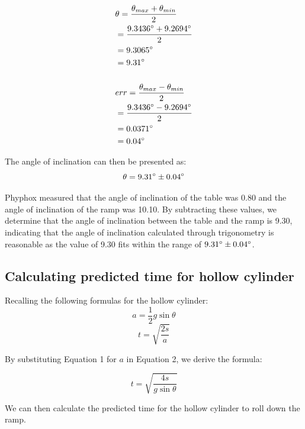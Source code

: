 \documentclass[letterpaper, 12pt]{article}
\begin{document}
\begin{align*}
     & \theta = \frac{\theta_{max} + \theta_{min}}{2}
    \\
     & = \frac{9.3436\degree + 9.2694\degree}{2}
    \\
     & = 9.3065\degree
    \\
     & = 9.31\degree
    \\
    \\
     & err = \frac{\theta_{max} - \theta_{min}}{2}
    \\
     & = \frac{9.3436\degree - 9.2694\degree}{2}
    \\
     & = 0.0371\degree
    \\
     & = 0.04\degree
\end{align*}

The angle of inclination can then be presented as:
$$
    \theta = 9.31\degree \pm 0.04\degree
$$

Phyphox measured that the angle of inclination of the table was 0.80\degree
and the angle of inclination of the ramp was 10.10\degree. By subtracting
these values, we determine that the angle of inclination between the table
and the ramp is 9.30\degree, indicating that the angle of inclination
calculated through trigonometry is reasonable as the value of 9.30\degree
fits within the range of $9.31\degree \pm 0.04\degree$.

\subsection{Calculating predicted time for hollow cylinder}

Recalling the following formulas for the hollow cylinder:
\begin{equation}
    a = \frac{1}{2}g\sin\theta
\end{equation}
\begin{equation}
    t = \sqrt{\frac{2s}{a}}
\end{equation}

By substituting Equation 1 for $a$ in Equation 2, we derive the formula:

$$
    t = \sqrt{\frac{4s}{g\sin\theta}}
$$

We can then calculate the predicted time for the hollow cylinder to roll
down the ramp.
\end{document}

